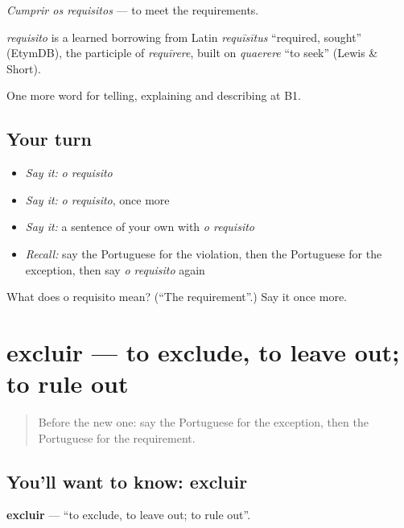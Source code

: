 \emph{Cumprir os requisitos} — to meet the requirements.

\begin{cousinweb}
\emph{requisito} is a learned borrowing from Latin \emph{requīsītus} \textquotedblleft{}required, sought\textquotedblright{} (EtymDB), the participle of \emph{requīrere}, built on \emph{quaerere} \textquotedblleft{}to seek\textquotedblright{} (Lewis \& Short).
\end{cousinweb}

\begin{grammarlens}[title={What you've built}]
One more word for telling, explaining and describing at B1.
\end{grammarlens}

\subsection*{Your turn}
\begin{itemize}
\raggedright
  \item \emph{Say it:} \emph{o requisito}
  \item \emph{Say it:} \emph{o requisito}, once more
  \item \emph{Say it:} a sentence of your own with \emph{o requisito}
  \item \emph{Recall:} say the Portuguese for the violation, then the Portuguese for the exception, then say \emph{o requisito} again
\end{itemize}

\begin{tcolorbox}[breakable,colback=teal!4,colframe=teal!35!black,title={Before you move on}]
What does o requisito mean? (\textquotedblleft{}The requirement\textquotedblright{}.) Say it once more.
\end{tcolorbox}
\section[excluir]{excluir — to exclude, to leave out; to rule out}

\label{lesson:PT-C383-excluir}



\begin{quote}
Before the new one: say the Portuguese for the exception, then the Portuguese for the requirement.
\end{quote}

\subsection*{You'll want to know: excluir}
\textbf{excluir} — \textquotedblleft{}to exclude, to leave out; to rule out\textquotedblright{}.

